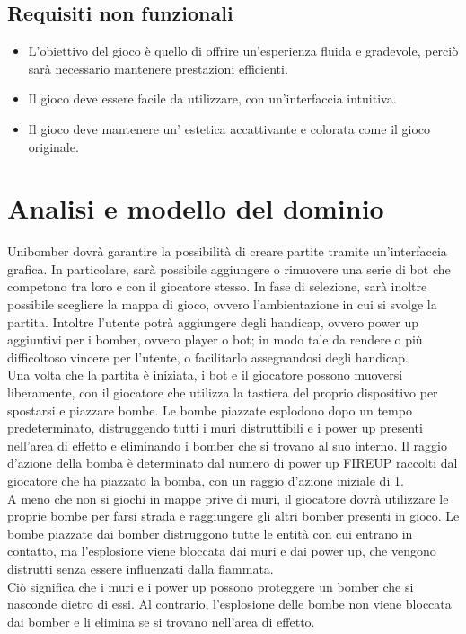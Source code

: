 \documentclass[a4paper,12pt]{report}
\begin{document}
\subsection*{Requisiti non funzionali}
\begin{itemize}
    \item L'obiettivo del gioco è quello di offrire un'esperienza fluida e gradevole, perciò sarà necessario mantenere prestazioni efficienti.
    \item Il gioco deve essere facile da utilizzare, con un'interfaccia intuitiva.
    \item Il gioco deve mantenere un’ estetica accattivante e colorata come il gioco originale.
\end{itemize}
\newpage
\section{Analisi e modello del dominio}
Unibomber dovrà garantire la possibilità di creare partite tramite un'interfaccia grafica. In particolare, sarà possibile aggiungere o rimuovere una serie di bot che competono tra loro e con il giocatore stesso. In fase di selezione, sarà inoltre possibile scegliere la mappa di gioco, ovvero l'ambientazione in cui si svolge la partita. Intoltre l'utente potrà aggiungere degli handicap, ovvero power up aggiuntivi per i bomber, ovvero player o bot; in modo tale da rendere o più difficoltoso vincere per l’utente, o facilitarlo assegnandosi degli handicap.
\\
Una volta che la partita è iniziata, i bot e il giocatore possono muoversi liberamente, con il giocatore che utilizza la tastiera del proprio dispositivo per spostarsi e piazzare bombe.
Le bombe piazzate esplodono dopo un tempo predeterminato, distruggendo tutti i muri distruttibili e i power up presenti nell'area di effetto e eliminando i bomber che si trovano al suo interno. Il raggio d'azione della bomba è determinato dal numero di power up FIREUP raccolti dal giocatore che ha piazzato la bomba, con un raggio d'azione iniziale di 1.
\\
A meno che non si giochi in mappe prive di muri, il giocatore dovrà utilizzare le proprie bombe per farsi strada e raggiungere gli altri bomber presenti in gioco. Le bombe piazzate dai bomber distruggono tutte le entità con cui entrano in contatto, ma l'esplosione viene bloccata dai muri e dai power up, che vengono distrutti senza essere influenzati dalla fiammata.
\\
Ciò significa che i muri e i power up possono proteggere un bomber che si nasconde dietro di essi. Al contrario, l'esplosione delle bombe non viene bloccata dai bomber e li elimina se si trovano nell'area di effetto.
\end{document}
